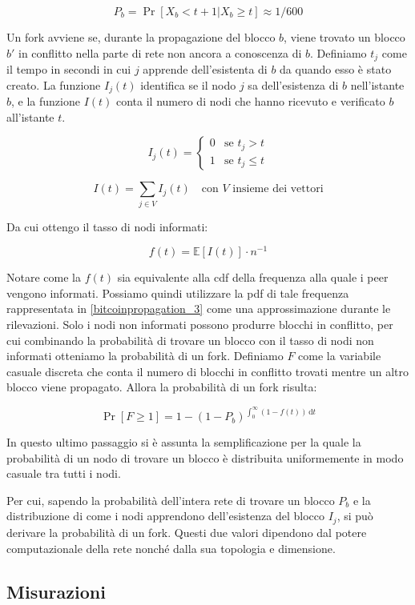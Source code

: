 \[ P_b = \Pr\left[ X_b < t + 1 | X_b \geq t\right] \approx 1/600 \]

Un fork avviene se, durante la propagazione del blocco $b$, viene trovato un blocco $b'$ in conflitto nella parte di rete non ancora a conoscenza di $b$. Definiamo $t_j$ come il tempo in secondi in cui $j$ apprende dell'esistenta di $b$ da quando esso è stato creato. La funzione $I_{j}(t)$ identifica se il nodo $j$ sa dell'esistenza di $b$ nell'istante $b$, e la funzione $I(t)$ conta il numero di nodi che hanno ricevuto e verificato $b$ all'istante $t$.

\[ I_{j}(t) = \begin{cases}
    0 &\textrm{se } t_j > t \\
    1 &\textrm{se } t_j \leq t
\end{cases}\]

\[ I(t) = \sum_{j \in V} I_{j}(t) \quad  \textrm{con }V\textrm{ insieme dei vettori} \]

Da cui ottengo il tasso di nodi informati:

\[ f(t) = \mathbb{E}[I(t)] \cdot n^{-1} \]

Notare come la $f(t)$ sia equivalente alla \gls{cdf} della frequenza alla quale i peer vengono informati. Possiamo quindi utilizzare la \gls{pdf} di tale frequenza rappresentata in \ref{bitcoinpropagation_3} come una approssimazione durante le rilevazioni. Solo i nodi non informati possono produrre blocchi in conflitto, per cui combinando la probabilità di trovare un blocco con il tasso di nodi non informati otteniamo la probabilità di un fork. Definiamo $F$ come la variabile casuale discreta che conta il numero di blocchi in conflitto trovati mentre un altro blocco viene propagato. Allora la probabilità di un fork risulta:

\[ \Pr\left[F \geq 1\right] = 1 - (1 - P_b)^{\int_{0}^{\infty} \! (1 - f(t)) \, \mathrm{d} t} \]

In questo ultimo passaggio si è assunta la semplificazione per la quale la probabilità di un nodo di trovare un blocco è distribuita uniformemente in modo casuale tra tutti i nodi.

Per cui, sapendo la probabilità dell'intera rete di trovare un blocco $P_b$ e la distribuzione di come i nodi apprendono dell'esistenza del blocco $I_j$, si può derivare la probabilità di un fork. Questi due valori dipendono dal potere computazionale della rete nonché dalla sua topologia e dimensione.

\subsection{Misurazioni}\label{misurazioni}

